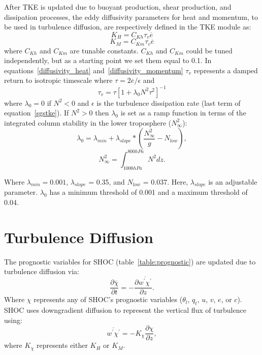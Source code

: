 \documentclass[12pt,titlepage]{article}
\numberwithin{equation}{section}
\begin{document}
After TKE is updated due to buoyant production, shear production, and dissipation processes, the eddy diffusivity parameters for heat and momentum, to be used in turbulence diffusion, are respectively defined in the TKE module as:
\begin{equation}
  K_{H}=C_{Kh} \tau_{v} \overline{e}
  \label{diffusivity_heat}
\end{equation}
%
\begin{equation}
  K_{M}=C_{Km} \tau_{v} \overline{e}
  \label{diffusivity_momentum}
\end{equation}
%
where $C_{Kh}$ and $C_{Km}$ are tunable constants.  $C_{Kh}$ and $C_{Km}$ could be tuned independently, but as a starting point we set them equal to 0.1.  In equations~\ref{diffusivity_heat} and~\ref{diffusivity_momentum} $\tau_{v}$ represents a damped return to isotropic timescale where $\tau=2\overline{e}/\epsilon$ and
%
\begin{equation}
  \tau_{v}=\tau\left[1+\lambda_{0}N^{2}\tau^{2}\right]^{-1}
  \label{tauv}
\end{equation}
% 
where $\lambda_{0}=0$ if $N^{2} < 0$ and $\epsilon$ is the turbulence dissipation rate (last term of equation~\ref{sgstke}).  If $N^{2} > 0$ then $\lambda_{0}$ is set as a ramp function in terms of the integrated column stability in the lower troposphere ($N_{\infty}^{2}$): 
%
\begin{equation}
  \lambda_{0} = \lambda_{min} + \lambda_{slope}*(\frac{N_{\infty}^{2}}{g} - N_{low}), 
  \label{lambda0}
\end{equation}
% 
%
\begin{equation}
  N_{\infty}^{2} = \int_{1000 hPa}^{800 hPa} N^{2} dz . 
  \label{int_N}
\end{equation}
%

Where $\lambda_{min} = 0.001$, $\lambda_{slope}$ = 0.35, and $N_{low}$ = 0.037.  Here, $\lambda_{slope}$ is an adjustable parameter.  $\lambda_{0}$ has a minimum threshold of 0.001 and a maximum threshold of 0.04.   
 
\section{Turbulence Diffusion}
\label{turb_diffusion}

The prognostic variables for SHOC (table~\ref{table:prognostic}) are updated due to turbulence diffusion via:
%
\begin{equation}
  \frac{\partial{\overline{\chi}}}{\partial{t}}= - \frac{\partial{\overline{w^{'}\chi^{'}}}}{\partial{z}} . 
  \label{turb_gov}
\end{equation}
%
Where $\chi$ represents any of SHOC's prognostic variables ($\theta_{l}$, $q_{t}$, $u$, $v$, $e$, or $c$).  SHOC uses downgradient diffusion to represent the vertical flux of turbulence using:
%
\begin{equation}
  \overline{w^{'}\chi^{'}} = -K_{\chi}\frac{\partial{\chi}}{\partial{z}}, 
  \label{vert_diffusion}
\end{equation}
%
where $K_{\chi}$ represents either $K_{H}$ or $K_{M}$.   
\end{document}
